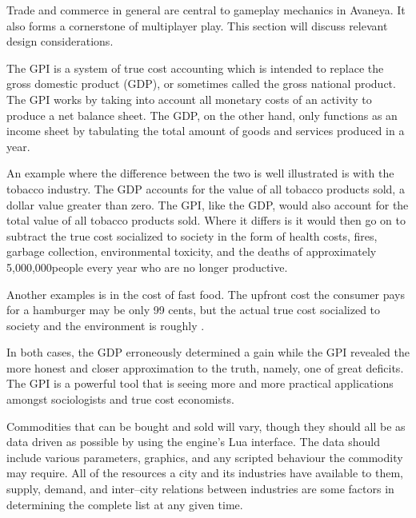

Trade and commerce in general are central to gameplay mechanics in Avaneya. It also forms a cornerstone of multiplayer play. This section will discuss relevant design considerations.

The GPI is a system of true cost accounting which is intended to replace the gross domestic product (GDP), or sometimes called the gross national product. The GPI works by taking into account all monetary costs of an activity to produce a net balance sheet. The GDP, on the other hand, only functions as an income sheet by tabulating the total amount of goods and services produced in a year.\footnotecite[cobb1999]

An example where the difference between the two is well illustrated is with the tobacco industry. The GDP accounts for the value of all tobacco products sold, a dollar value greater than zero. The GPI, like the GDP, would also account for the total value of all tobacco products sold. Where it differs is it would then go on to subtract the true cost socialized to society in the form of health costs, fires, garbage collection, environmental toxicity, and the deaths of approximately 5,000,000 people every year who are no longer productive. 

Another examples is in the cost of fast food. The upfront cost the consumer pays for a hamburger may be only 99 cents, but the actual true cost socialized to society and the environment is roughly .\footnotecite[extras={ p.~46.}][raj2010]

In both cases, the GDP erroneously determined a gain while the GPI revealed the more honest and closer approximation to the truth, namely, one of great deficits. The GPI is a powerful tool that is seeing more and more practical applications amongst sociologists and true cost economists.\footnotecite[costanzaa2004]

Commodities that can be bought and sold will vary, though they should all be as data driven as possible by using the engine's Lua interface. The data should include various parameters, graphics, and any scripted behaviour the commodity may require. All of the resources a city and its industries have available to them, supply, demand, and inter--city relations between industries are some factors in determining the complete list at any given time.

